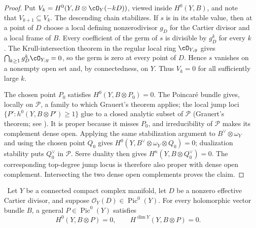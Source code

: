 \begin{proof}
Put
  \(V_k=H^0(Y,B\otimes\cO_Y(-kD))\), viewed inside $H^0(Y,B)$, and note
  that $V_{k+1}\subseteq V_k$.  The descending chain stabilizes.  If $s$ is
  in its stable value, then at a point of $D$ choose a local defining
  nonzerodivisor $g_D$ for the Cartier divisor and a local frame of $B$.
  Every coefficient of the germ of $s$ is divisible by $g_D^k$ for every
  $k$.  The Krull-intersection theorem in the regular local ring
  $\cO_{Y,y}$ gives $\bigcap_{k\ge1}g_D^k\cO_{Y,y}=0$, so the germ is zero at
  every point of $D$.  Hence $s$ vanishes on a nonempty open set and, by
  connectedness, on $Y$.  Thus $V_k=0$ for all sufficiently large $k$.

  The chosen point $P_0$ satisfies
  $H^0(Y,B\otimes P_0)=0$.  The Poincar\'e bundle gives, locally on
$\mathcal P$, a family to which Grauert's theorem applies; the local jump
  loci $\{P':h^0(Y,B\otimes P')\ge1\}$ glue to a closed analytic subset of
  $\mathcal P$ (Grauert's theorem; see \cite{Grauert1960D,BS76push}).  It is proper because it misses $P_0$, and irreducibility of
$\mathcal P$ makes its complement dense open.  Applying the same stabilization
argument to $B^\vee\otimes\omega_Y$ and using the chosen point $Q_0$ gives
$H^0(Y,B^\vee\otimes\omega_Y\otimes Q_0)=0$; dualization stability puts
$Q_0^\vee$ in $\mathcal P$.  Serre duality then gives
$H^n(Y,B\otimes Q_0^\vee)=0$.  The corresponding top-degree jump locus is
therefore also proper with dense open complement.  Intersecting the two
dense open complements proves the claim.
\end{proof}

\begin{lemma}\label{wbII:lem:cdp-generic-endpoints}
\ Let \(Y\) be a connected compact complex manifold, let \(D\) be
a nonzero effective Cartier divisor, and suppose
\(\mathcal O_Y(D)\in\operatorname{Pic}^0(Y)\).  For every holomorphic vector
bundle \(B\), a general \(P\in\operatorname{Pic}^0(Y)\) satisfies
\[
 H^0(Y,B\otimes P)=0,\qquad
 H^{\dim Y}(Y,B\otimes P)=0.
\tag{W.50}\label{wbII:eq:W:5.23}
\]
\end{lemma}

